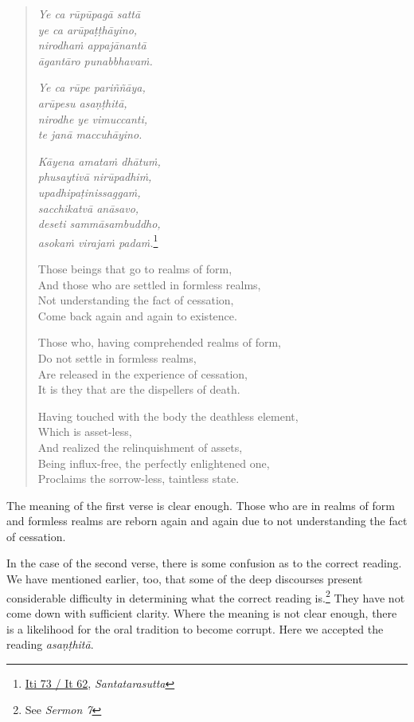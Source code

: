 \begin{quote}
\emph{Ye ca rūpūpagā sattā}\\
\emph{ye ca arūpaṭṭhāyino,}\\
\emph{nirodhaṁ appajānantā}\\
\emph{āgantāro punabbhavaṁ.}

\emph{Ye ca rūpe pariññāya,}\\
\emph{arūpesu asaṇṭhitā,}\\
\emph{nirodhe ye vimuccanti,}\\
\emph{te janā maccuhāyino.}

\emph{Kāyena amataṁ dhātuṁ,}\\
\emph{phusaytivā nirūpadhiṁ,}\\
\emph{upadhipaṭinissaggaṁ,}\\
\emph{sacchikatvā anāsavo,}\\
\emph{deseti sammāsambuddho,}\\
\emph{asokaṁ virajaṁ padaṁ.}\footnote{\href{https://suttacentral.net/iti73/pli/ms}{Iti 73 / It 62}, \emph{Santatarasutta}}

Those beings that go to realms of form,\\
And those who are settled in formless realms,\\
Not understanding the fact of cessation,\\
Come back again and again to existence.

Those who, having comprehended realms of form,\\
Do not settle in formless realms,\\
Are released in the experience of cessation,\\
It is they that are the dispellers of death.

Having touched with the body the deathless element,\\
Which is asset-less,\\
And realized the relinquishment of assets,\\
Being influx-free, the perfectly enlightened one,\\
Proclaims the sorrow-less, taintless state.
\end{quote}

The meaning of the first verse is clear enough. Those who are in realms of form and formless realms are reborn again and again due to not understanding the fact of cessation.

In the case of the second verse, there is some confusion as to the correct reading. We have mentioned earlier, too, that some of the deep discourses present considerable difficulty in determining what the correct reading is.\footnote{See \emph{Sermon 7}} They have not come down with sufficient clarity. Where the meaning is not clear enough, there is a likelihood for the oral tradition to become corrupt. Here we accepted the reading \emph{asaṇṭhitā}.

